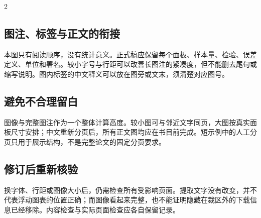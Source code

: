 \documentclass[UTF8,fontset=none,scheme=plain]{ctexart}
\renewcommand{\normalsize}{\fontsize{9.05bp}{12.1bp}\selectfont}
\newenvironment{NGColumns}{\begin{multicols}{2}\normalsize}{\end{multicols}}
\begin{document}
\begin{NGColumns}
\subsection*{图注、标签与正文的衔接}
本图只有阅读顺序，没有统计意义。正式稿应保留每个面板、样本量、检验、误差定义、单位和署名。较小字号与行距可以改善长图注的紧凑度，但不能删去尾句或缩写说明。图内标签的中文释义可以放在图旁或文末，须清楚对应图号。
\subsection*{避免不合理留白}
图像与完整图注作为一个整体计算高度。较小图可与邻近文字同页，大图按真实面板尺寸安排；中文重新分页后，所有正文图均应在书目前完成。短示例中的人工分页只用于展示结构，不是完整论文的固定分页要求。
\subsection*{修订后重新核验}
换字体、行距或图像大小后，仍需检查所有受影响页面。提取文字没有改变，并不代表浮动图表的位置正确；而图像看起来完整，也不能证明隐藏在裁区外的下载信息已经移除。内容检查与实际页面检查应各自保留记录。
\end{NGColumns}
\clearpage
\end{document}
